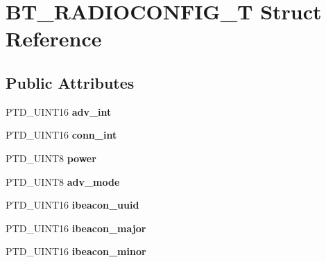 \hypertarget{struct_b_t___r_a_d_i_o_c_o_n_f_i_g___t}{}\section{B\+T\+\_\+\+R\+A\+D\+I\+O\+C\+O\+N\+F\+I\+G\+\_\+T Struct Reference}
\label{struct_b_t___r_a_d_i_o_c_o_n_f_i_g___t}
\subsection*{Public Attributes}
\begin{DoxyCompactItemize}
\item 
P\+T\+D\+\_\+\+U\+I\+N\+T16 {\bfseries adv\+\_\+int}\hypertarget{struct_b_t___r_a_d_i_o_c_o_n_f_i_g___t_ad33001fb2788fb7f7ee708d19501411d}{}\label{struct_b_t___r_a_d_i_o_c_o_n_f_i_g___t_ad33001fb2788fb7f7ee708d19501411d}

\item 
P\+T\+D\+\_\+\+U\+I\+N\+T16 {\bfseries conn\+\_\+int}\hypertarget{struct_b_t___r_a_d_i_o_c_o_n_f_i_g___t_a22d62d1efb45a3c59d1fabd7bf06a12d}{}\label{struct_b_t___r_a_d_i_o_c_o_n_f_i_g___t_a22d62d1efb45a3c59d1fabd7bf06a12d}

\item 
P\+T\+D\+\_\+\+U\+I\+N\+T8 {\bfseries power}\hypertarget{struct_b_t___r_a_d_i_o_c_o_n_f_i_g___t_a5f380703f2fdc83686b02f7195a79454}{}\label{struct_b_t___r_a_d_i_o_c_o_n_f_i_g___t_a5f380703f2fdc83686b02f7195a79454}

\item 
P\+T\+D\+\_\+\+U\+I\+N\+T8 {\bfseries adv\+\_\+mode}\hypertarget{struct_b_t___r_a_d_i_o_c_o_n_f_i_g___t_acf7c07be6fbdc7a3e98a80c4d7f4ffdc}{}\label{struct_b_t___r_a_d_i_o_c_o_n_f_i_g___t_acf7c07be6fbdc7a3e98a80c4d7f4ffdc}

\item 
P\+T\+D\+\_\+\+U\+I\+N\+T16 {\bfseries ibeacon\+\_\+uuid}\hypertarget{struct_b_t___r_a_d_i_o_c_o_n_f_i_g___t_ad6dfca1289e15f0724b9bae23fe859c3}{}\label{struct_b_t___r_a_d_i_o_c_o_n_f_i_g___t_ad6dfca1289e15f0724b9bae23fe859c3}

\item 
P\+T\+D\+\_\+\+U\+I\+N\+T16 {\bfseries ibeacon\+\_\+major}\hypertarget{struct_b_t___r_a_d_i_o_c_o_n_f_i_g___t_aeb5cc04ec74670d4285fb2e75b718b88}{}\label{struct_b_t___r_a_d_i_o_c_o_n_f_i_g___t_aeb5cc04ec74670d4285fb2e75b718b88}

\item 
P\+T\+D\+\_\+\+U\+I\+N\+T16 {\bfseries ibeacon\+\_\+minor}\hypertarget{struct_b_t___r_a_d_i_o_c_o_n_f_i_g___t_a7fa1e31f642afc5ce4e2021ca9d9a426}{}\label{struct_b_t___r_a_d_i_o_c_o_n_f_i_g___t_a7fa1e31f642afc5ce4e2021ca9d9a426}


\end{DoxyCompactItemize}

